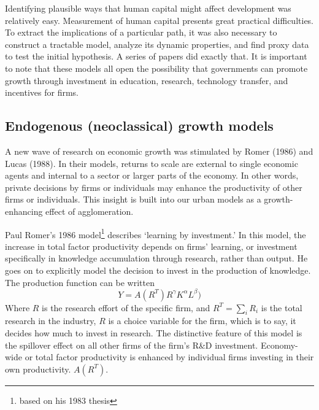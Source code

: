 


Identifying  plausible ways that human capital might affect development was relatively easy. Measurement of human capital presents great practical difficulties. To extract the implications of a particular path, it was also necessary to construct a tractable model, analyze its dynamic properties, and find proxy data to test the initial hypothesis.   A series of papers did exactly that. It is important to note that these models all open the possibility that governments can  promote growth through investment in education, research, technology transfer, and incentives for firms.

\subsection{Endogenous (neoclassical) growth models}
A new wave of research on economic growth was stimulated by Romer (1986) and Lucas (1988). In their models, returns to scale are external to single economic agents and internal to a sector or larger parts of the economy. In other words, private decisions by firms or individuals may enhance the productivity of other firms or individuals. This  insight is built into our urban models as a growth-enhancing effect of agglomeration. 


Paul Romer's 1986  model\footnote{ based on his 1983 thesis} describes `learning by investment.' In this model, the increase in {total factor productivity} depends on firms' learning, or investment specifically in knowledge accumulation through research, rather than output. He goes on to  explicitly model the decision to invest in the production of knowledge. The production function  can be written
\[Y = A(R^T)R^\gamma  K^\alpha L^\beta) \]
Where $R$ is the research effort of the specific firm, and $R^T=\sum_iR_i$ is the total research in the industry,  $R$ is a choice variable for the firm, which is to say, it decides how much to invest in research. The distinctive  feature of this model is the spillover effect on all other firms of the firm's R\&D investment. Economy-wide or  \gls{total factor productivity} is enhanced by individual firms investing in their own productivity. $A(R^T)$. %

